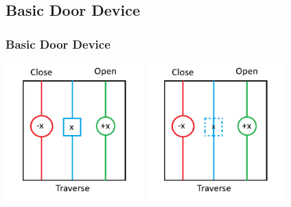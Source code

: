 \documentclass{beamer}
\begin{document}
\subsection{Basic Door Device}
\begin{frame}
  \frametitle{Basic Door Device}
  \centerline{
    \includegraphics[width=0.40\textwidth]{res/Door.png}
    \hspace{2.5cm}
    \includegraphics[width=0.40\textwidth]{res/DoorOpend.png}
  }
\end{frame}
\end{document}
